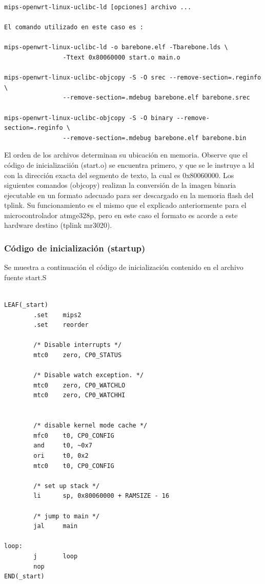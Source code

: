 \documentclass[output=paper, 
colorlinks,
citecolor=brown,
newtxmath
]{langscibook}
\begin{document}
\begin{verbatim}
mips-openwrt-linux-uclibc-ld [opciones] archivo ...

El comando utilizado en este caso es :

mips-openwrt-linux-uclibc-ld -o barebone.elf -Tbarebone.lds \
                -Ttext 0x80060000 start.o main.o

mips-openwrt-linux-uclibc-objcopy -S -O srec --remove-section=.reginfo \
                --remove-section=.mdebug barebone.elf barebone.srec

mips-openwrt-linux-uclibc-objcopy -S -O binary --remove-section=.reginfo \
                --remove-section=.mdebug barebone.elf barebone.bin
\end{verbatim}


El orden de los archivos determinan su ubicación en memoria. Observe
que el código de inicializaciión (start.o) se encuentra primero, y que
se le instruye a ld con la dirección exacta del segmento de texto,
la cual es 0x80060000. Los siguientes comandos (objcopy) realizan la 
conversión de la imagen binaria ejecutable
en un formato adecuado para ser descargado en la memoria flash del tplink.
Su funcionamiento es el mismo que el explicado anteriormente 
para el microcontrolador atmge328p, pero en este caso el formato
es acorde a este hardware destino (tplink mr3020).


\subsubsection {Código de inicialización (startup)}

Se muestra a continuación el código de inicialización contenido en el archivo
fuente start.S

\begin{verbatim}

LEAF(_start)
        .set    mips2
        .set    reorder

        /* Disable interrupts */
        mtc0    zero, CP0_STATUS

        /* Disable watch exception. */
        mtc0    zero, CP0_WATCHLO
        mtc0    zero, CP0_WATCHHI


        /* disable kernel mode cache */
        mfc0    t0, CP0_CONFIG
        and     t0, ~0x7
        ori     t0, 0x2
        mtc0    t0, CP0_CONFIG

        /* set up stack */
        li      sp, 0x80060000 + RAMSIZE - 16

        /* jump to main */
        jal     main

loop:
        j       loop
        nop
END(_start)
\end{verbatim}
\end{document}
